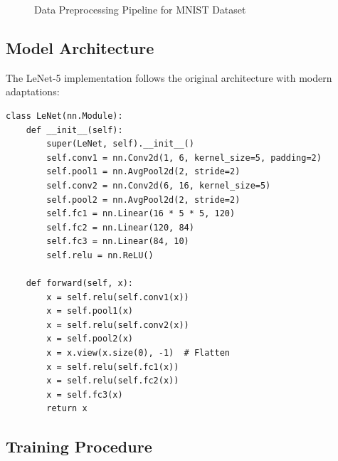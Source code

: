 \documentclass[a4paper, journal]{IEEEtran}
\begin{document}
\begin{figure}[h]
{
    }
    \caption{Data Preprocessing Pipeline for MNIST Dataset}
    \label{fig:preprocessing}
\end{figure}
\subsection{Model Architecture}

The LeNet-5 implementation follows the original architecture with modern adaptations:

\begin{lstlisting}[caption=LeNet Architecture Implementation]
class LeNet(nn.Module):
    def __init__(self):
        super(LeNet, self).__init__()
        self.conv1 = nn.Conv2d(1, 6, kernel_size=5, padding=2)
        self.pool1 = nn.AvgPool2d(2, stride=2)
        self.conv2 = nn.Conv2d(6, 16, kernel_size=5)
        self.pool2 = nn.AvgPool2d(2, stride=2)
        self.fc1 = nn.Linear(16 * 5 * 5, 120)
        self.fc2 = nn.Linear(120, 84)
        self.fc3 = nn.Linear(84, 10)
        self.relu = nn.ReLU()
    
    def forward(self, x):
        x = self.relu(self.conv1(x))
        x = self.pool1(x)
        x = self.relu(self.conv2(x))
        x = self.pool2(x)
        x = x.view(x.size(0), -1)  # Flatten
        x = self.relu(self.fc1(x))
        x = self.relu(self.fc2(x))
        x = self.fc3(x)
        return x
\end{lstlisting}


\subsection{Training Procedure}
\end{document}
